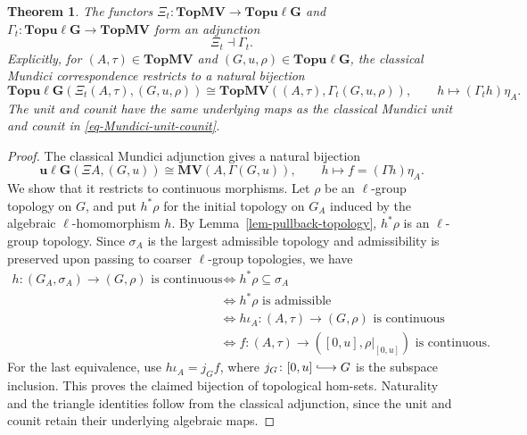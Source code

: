 \documentclass[preprint,3p]{elsarticle}
\theoremstyle{plain}
\newtheorem{thm}{Theorem}[section]
\theoremstyle{definition}
\newcommand{\longhookrightarrow}{\lhook\joinrel\longrightarrow}
\newcommand{\TopMV}{\mathbf{TopMV}}
\newcommand{\Topulg}{\mathbf{Topu\ell G}}
\newcommand{\uLG}{\mathbf{u\ell G}}
\newcommand{\MV}{\mathbf{MV}}
\numberwithin{equation}{section}
\begin{document}
\begin{thm}
\label{thm-topological-adjunction}
The functors $\Xi_t\colon\TopMV\longrightarrow\Topulg$ and
$\Gamma_t\colon\Topulg\longrightarrow\TopMV$ form an adjunction
\[
 \Xi_t\dashv\Gamma_t.
\]
Explicitly, for $(A,\tau)\in\TopMV$ and $(G,u,\rho)\in\Topulg$, the classical
Mundici correspondence restricts to a natural bijection
\begin{equation}
\label{eq-topological-Mundici-bijection}
 \Topulg(\Xi_t(A,\tau),(G,u,\rho))
 \cong
 \TopMV((A,\tau),\Gamma_t(G,u,\rho)),
 \qquad h\mapsto(\Gamma_t h)\eta_A.
\end{equation}
The unit and counit have the same underlying maps as the classical
Mundici unit and counit in \eqref{eq-Mundici-unit-counit}.
\end{thm}

\begin{proof}
The classical Mundici adjunction gives a natural bijection
\begin{equation}
\label{eq-algebraic-Mundici-bijection}
 \uLG(\Xi A,(G,u))
 \cong
 \MV(A,\Gamma(G,u)),
 \qquad
 h\mapsto f=(\Gamma h)\eta_A.
\end{equation}
We show that it restricts to continuous morphisms.  Let
$\rho$ be an $\ell$-group topology on $G$, and put
$h^*\rho$ for the initial topology on $G_A$ induced by
the algebraic $\ell$-homomorphism $h$.
By Lemma~\ref{lem-pullback-topology}, $h^*\rho$ is
an $\ell$-group topology.  Since $\sigma_A$ is the largest
admissible topology and admissibility is preserved upon
passing to coarser $\ell$-group topologies, we have
\[
\begin{aligned}
 h\colon(G_A,\sigma_A)\longrightarrow(G,\rho)
   \text{ is continuous}
 &\iff
   h^*\rho\subseteq\sigma_A\\
 &\iff
   h^*\rho\text{ is admissible}\\
 &\iff
   h\iota_A\colon(A,\tau)\longrightarrow(G,\rho)
   \text{ is continuous}\\
 &\iff
   f\colon(A,\tau)\longrightarrow([0,u],\rho|_{[0,u]})
   \text{ is continuous}.
\end{aligned}
\]
For the last equivalence, use
$h\iota_A=j_Gf$, where
$j_G\colon[0,u]\longhookrightarrow G$ is the subspace inclusion.
This proves the claimed bijection of topological hom-sets.
Naturality and the triangle identities follow from the classical
adjunction, since the unit and counit retain their underlying
algebraic maps.
\end{proof}
\end{document}
